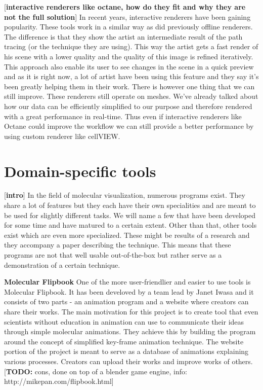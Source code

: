 \documentclass[
  digital, %
  table,   %
  nolof,     %
  nolot,     %
]{fithesis3}
\begin{document}
[\textbf{interactive renderers like octane, how do they fit and why they are not the full solution}]
In recent years, interactive renderers have been gaining popularity. These tools work in a similar way as did previously offline renderers. The difference is that they show the artist an intermediate result of the path tracing (or the technique they are using). This way the artist gets a fast render of his scene with a lower quality and the quality of this image is refined iteratively. This approach also enable its user to see changes in the scene in a quick preview and as it is right now, a lot of artist have been using this feature and they say it's been greatly helping them in their work. There is however one thing that we can still improve. These renderers still operate on meshes. We've already talked about how our data can be efficiently simplified to our purpose and therefore rendered with a great performance in real-time. Thus even if interactive renderers like Octane could improve the workflow we can still provide a better performance by using custom renderer like cellVIEW.

\section{Domain-specific tools}
[\textbf{intro}]
In the field of molecular visualization, numerous programs exist. They share a lot of features but they each have their own specialities and are meant to be used for slightly different tasks. We will name a few that have been developed for some time and have matured to a certain extent. Other than that, other tools exist which are even more specialized. These might be results of a research and they accompany a paper describing the technique. This means that these programs are not that well usable out-of-the-box but rather serve as a demonstration of a certain technique.

\textbf{Molecular Flipbook}
One of the more user-friendlier and easier to use tools is Molecular Flipbook. It has been develoved by a team lead by Janet Iwasa and it consists of two parts - an animation program and a website where creators can share their works. The main motivation for this project is to create tool that even scientists without education in animation can use to communicate their ideas through simple molecular animations. They achieve this by building the program around the concept of simplified key-frame animation technique. The website portion of the project is meant to serve as a database of animations explaining various processes. Creators can upload their works and improve works of others.
[\textbf{TODO:} cons, done on top of a blender game engine, info: http://mikepan.com/flipbook.html]
\end{document}
